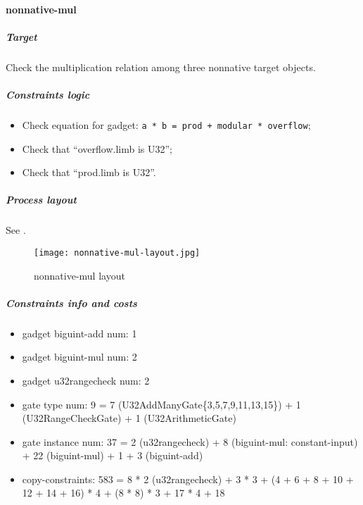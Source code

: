 \paragraph{nonnative-mul}

\subparagraph{Target}
Check the multiplication relation among three nonnative target objects.

\subparagraph{Constraints logic}
\begin{itemize}
    \item Check equation for gadget: \verb|a * b = prod + modular * overflow|;
    \item Check that ``overflow.limb is U32'';
    \item Check that ``prod.limb is U32''.
\end{itemize}

\subparagraph{Process layout}
See .
\begin{figure}[!ht]
    \centering
    \texttt{[image: nonnative-mul-layout.jpg]}
    \caption{nonnative-mul layout}
    \label{fig:nonnative-mul-layout}
\end{figure}

\subparagraph{Constraints info and costs}
\begin{itemize}
    \item gadget biguint-add num: 1
    \item gadget biguint-mul num: 2
    \item gadget u32rangecheck num: 2
    \item gate type num: 9 = 7 (U32AddManyGate\{3,5,7,9,11,13,15\}) + 1 (U32RangeCheckGate) + 1 (U32ArithmeticGate)
    \item gate instance num: 37 = 2 (u32rangecheck) + 8 (biguint-mul: constant-input) + 22 (biguint-mul) + 1 + 3 (biguint-add)
    \item copy-constraints: 583 = 8 * 2 (u32rangecheck) + 3 * 3 + (4 + 6 + 8 + 10 + 12 + 14 + 16) * 4 + (8 * 8) * 3 + 17 * 4 + 18
\end{itemize}
